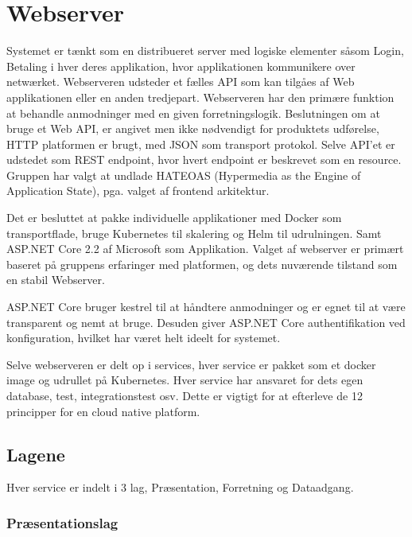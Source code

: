\chapter{Webserver}

Systemet er tænkt som en distribueret server med logiske elementer såsom Login, Betaling i hver deres applikation, hvor applikationen kommunikere over netwærket. Webserveren udsteder et fælles API som kan tilgåes af Web applikationen eller en anden tredjepart. Webserveren har den primære funktion at behandle anmodninger med en given forretningslogik. Beslutningen om at bruge et Web API, er angivet men ikke nødvendigt for produktets udførelse, HTTP platformen er brugt, med JSON som transport protokol. Selve API'et er udstedet som REST endpoint, hvor hvert endpoint er beskrevet som en resource. Gruppen har valgt at undlade HATEOAS (Hypermedia as the Engine of Application State), pga. valget af frontend arkitektur.

Det er besluttet at pakke individuelle applikationer med Docker som transportflade, bruge Kubernetes til skalering og Helm til udrulningen. Samt ASP.NET Core 2.2 af Microsoft som Applikation. Valget af webserver er primært baseret på gruppens erfaringer med platformen, og dets nuværende tilstand som en stabil Webserver.

ASP.NET Core bruger kestrel til at håndtere anmodninger og er egnet til at være transparent og nemt at bruge. Desuden giver ASP.NET Core authentifikation ved konfiguration, hvilket har været helt ideelt for systemet.

Selve webserveren er delt op i services, hver service er pakket som et docker image og udrullet på Kubernetes. Hver service har ansvaret for dets egen database, test, integrationstest osv. Dette er vigtigt for at efterleve de 12 principper for en cloud native platform.

\section{Lagene}

Hver service er indelt i 3 lag, Præsentation, Forretning og Dataadgang.

\subsection{Præsentationslag}


